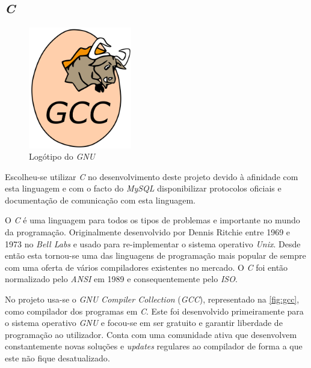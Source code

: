 \documentclass[11pt,twoside,a4paper]{report}
\begin{document}
\subsection{\textit{C}}
\begin{figure}[H]
	\begin{center}
		\includegraphics[width=0.4\textwidth]{gcc} %
		\caption{Logótipo do \textit{GNU}}
		\label{fig:gcc}
	\end{center}
\end{figure}
Escolheu-se utilizar \textit{C} no desenvolvimento deste projeto devido à afinidade com esta linguagem e com o facto do \textit{MySQL} disponibilizar protocolos oficiais e documentação de comunicação com esta linguagem\cite{mysql}.\par
O \textit{C} é uma linguagem para todos os tipos de problemas e importante no mundo da programação. Originalmente desenvolvido por Dennis Ritchie entre 1969 e 1973 no \textit{Bell Labs} e usado para re-implementar o sistema operativo \textit{Unix}. Desde então esta tornou-se uma das linguagens de programação mais popular de sempre com uma oferta de vários compiladores existentes no mercado. O \textit{C} foi então normalizado pelo \textit{ANSI} em 1989 e consequentemente pelo \textit{ISO}.\par 
No projeto usa-se o \textit{GNU Compiler Collection} (\textit{GCC}), representado na \autoref{fig:gcc}, como compilador dos programas em \textit{C}. Este foi desenvolvido primeiramente para o sistema operativo \textit{GNU} e focou-se em ser gratuito e garantir liberdade de programação ao utilizador. Conta com uma comunidade ativa que desenvolvem constantemente novas soluções e \textit{updates} regulares ao compilador de forma a que este não fique desatualizado\cite{gcc}.
\end{document}

